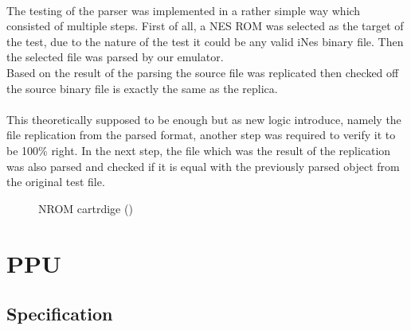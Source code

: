\documentclass[]{report}
\begin{document}
\paragraph{ }
The testing of the parser was implemented in a rather simple way which consisted of multiple steps.
First of all, a NES ROM was selected as the target of the test, due to the nature of the test it could be any valid iNes binary file. Then the selected file was parsed by our emulator. 
\\
Based on the result of the parsing the source file was replicated then checked off the source binary file is exactly the same as the replica. 
\paragraph{ }
This theoretically supposed to be enough but as new logic introduce, namely the file replication from the parsed format, another step was required to verify it to be 100\% right. In the next step, the file which was the result of the replication was also parsed and checked if it is equal with the previously parsed object from the original test file.  

\begin{figure}[!htb]
	\caption{\label{fig:my-label} NROM cartrdige (\cite{ROM1})}
\end{figure}
\clearpage

\section{PPU}

\subsection{Specification}
\end{document}
